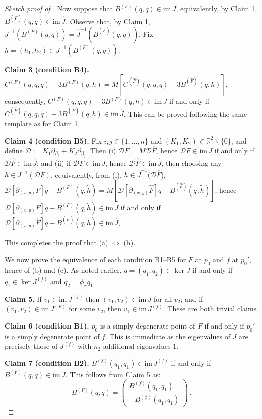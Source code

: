 \documentclass[11pt]{amsart}
\newcommand{\R}{\mathbb{R}}
\newcommand{\wF}{\widehat{F}}
\newcommand{\wJ}{\hat{J}}
\newcommand{\mD}{\mathcal{D}}
\theoremstyle{definition}
\begin{document}
\begin{proof}[Sketch proof of ]
Now suppose that $B^{(F)}(q,q) \in \mathrm{im}\,J$, equivalently, by Claim 1, $B^{(\wF)}(q,q) \in \mathrm{im}\,\wJ$. Observe that, by Claim 1, $J^{-1}(B^{(F)}(q,q)) = \wJ^{-1}(B^{(\wF)}(q,q))$. Fix $h = (h_1, h_2) \in J^{-1}(B^{(F)}(q,q))$. 

{\bf Claim 3 (condition B4).} $C^{(F)}(q,q,q) - 3B^{(F)}(q, h) = M[C^{(\wF)}(q,q,q) - 3B^{(\wF)}(q, h)]$, consequently, $C^{(F)}(q,q,q) - 3B^{(F)}(q, h) \in \mathrm{im}\,J$ if and only if $C^{(\wF)}(q,q,q) - 3B^{(\wF)}(q, h) \in \mathrm{im}\,\wJ$. This can be proved following the same template as for Claim 1.

{\bf Claim 4 (condition B5).} Fix $i,j \in \{1, \ldots, n\}$ and $(K_1, K_2) \in \R^2\backslash\{0\}$, and define $\mD:= K_1 \partial_{\beta_i}+ K_2 \partial_{\beta_j}$. Then (i) $\mD F  = M\mD \wF $, hence $\mD F  \in \mathrm{im}\,J$ if and only if $\mD \wF  \in \mathrm{im}\,\wJ$; and (ii) if $\mD F  \in \mathrm{im}\,J$, hence $\mD \wF  \in \mathrm{im}\,\wJ$, then choosing any $\tilde{h} \in J^{-1}(\mD F)$, equivalently, from (i), $\tilde{h} \in \wJ^{-1}( \mD \wF$), $\mD[\partial_{(x,y)}F]q - B^{(F)}(q,\tilde{h}) = M[\mD[\partial_{(x,y)}\wF]q - B^{(\wF)}(q,\tilde{h})]$, hence $\mD[\partial_{(x,y)}F]q - B^{(F)}(q,\tilde{h}) \in \mathrm{im}\,J$ if and only if  $\mD[\partial_{(x,y)}\wF]q - B^{(\wF)}(q,\tilde{h}) \in \mathrm{im}\,\wJ$. 

This completes the proof that (a) $ \Leftrightarrow$ (b). 

We now prove the equivalence of each condition B1--B5 for $F$ at $p_0$ and $f$ at $p_0'$, hence of (b) and (c). As noted earlier, $q=(q_1, q_2) \in \ker J$ if and only if $q_1 \in \ker J^{(f)}$ and $q_2 = \phi_x q_1$. 

{\bf Claim 5.} If $v_1 \in \mathrm{im}\,J^{(f)}$ then $(v_1,v_2) \in \mathrm{im}\,J$ for all $v_2$; and if $(v_1, v_2) \in \mathrm{im}\,J^{(F)}$ for some $v_2$, then $v_1 \in \mathrm{im}\,J^{(f)}$. These are both trivial claims. 

{\bf Claim 6 (condition B1).} $p_0$ is a simply degenerate point of $F$ if and only if $p_0'$ is a simply degenerate point of $f$. This is immediate as the eigenvalues of $J$ are precisely those of $J^{(f)}$ with $n_2$ additional eigenvalues $1$. 

{\bf Claim 7 (condition B2).} $B^{(f)}(q_1,q_1) \in \mathrm{im}\,J^{(f)}$ if and only if $B^{(F)}(q,q) \in \mathrm{im}\,J$. This follows from Claim 5 as:
\[
B^{(F)}(q,q) = \left(\begin{array}{c}B^{(f)}(q_1,q_1)\\-B^{(\phi)}(q_1,q_1)\end{array}\right)\,.
\]


\end{proof}
\end{document}
